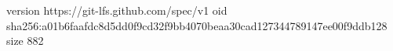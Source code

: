 version https://git-lfs.github.com/spec/v1
oid sha256:a01b6faafdc8d5dd0f9cd32f9bb4070beaa30cad127344789147ee00f9ddb128
size 882
